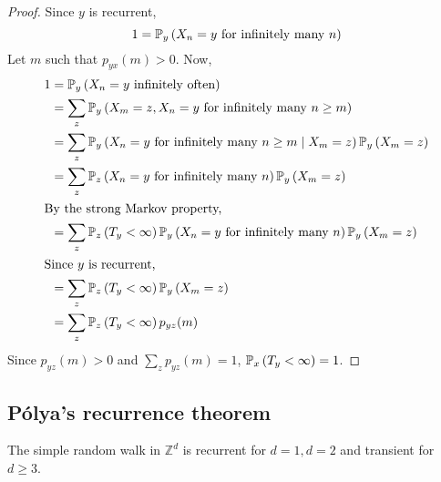 \begin{proof}
	Since \( y \) is recurrent,
	\[
		1 = \mathbb{P}_{y}\left({X_n = y \text{ for infinitely many } n}\right)
	\]
	Let \( m \) such that \( p_{yx}(m) > 0 \).
	Now,
	\begin{align*}
		1 & = \mathbb{P}_{y}\left({X_n = y \text{ infinitely often}}\right)                                                       \\
		  & = \sum_z \mathbb{P}_{y}\left({X_m = z, X_n = y \text{ for infinitely many } n \geq m}\right)                          \\
		  & = \sum_z \mathbb{P}_{y}\left({X_n = y \text{ for infinitely many } n \geq m \mid X_m = z}\right) \mathbb{P}_{y}\left({X_m = z}\right)    \\
		  & = \sum_z \mathbb{P}_{z}\left({X_n = y \text{ for infinitely many } n}\right) \mathbb{P}_{y}\left({X_m = z}\right)                        \\
		\intertext{By the strong Markov property,}
		  & = \sum_z \mathbb{P}_{z}\left({T_y < \infty}\right) \mathbb{P}_{y}\left({X_n = y \text{ for infinitely many } n}\right) \mathbb{P}_{y}\left({X_m = z}\right) \\
		\intertext{Since \( y \) is recurrent,}
		  & = \sum_z \mathbb{P}_{z}\left({T_y < \infty}\right) \mathbb{P}_{y}\left({X_m = z}\right)                                                  \\
		  & = \sum_z \mathbb{P}_{z}\left({T_y < \infty}\right) p_{yz}(m)
	\end{align*}
	Since \( p_{yz}(m) > 0 \) and \( \sum_z p_{yz}(m) = 1 \), \( \mathbb{P}_{x}\left({T_y < \infty}\right) = 1 \).
\end{proof}

\subsection{P\'olya's recurrence theorem}
\begin{theorem}
	The simple random walk in \( \mathbb Z^d \) is recurrent for \( d = 1, d = 2 \) and transient for \( d \geq 3 \).
\end{theorem}
